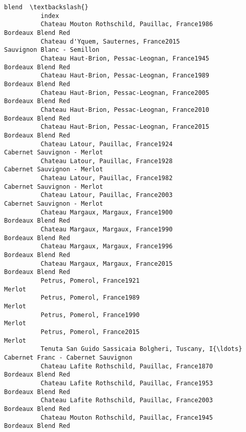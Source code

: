 \documentclass[11pt]{article}
\begin{document}
\begin{Verbatim}[commandchars=\\\{\}]
                                                                                            blend  \textbackslash{}
          index                                                                                     
          Chateau Mouton Rothschild, Pauillac, France1986                      Bordeaux Blend Red   
          Chateau d'Yquem, Sauternes, France2015                       Sauvignon Blanc - Semillon   
          Chateau Haut-Brion, Pessac-Leognan, France1945                       Bordeaux Blend Red   
          Chateau Haut-Brion, Pessac-Leognan, France1989                       Bordeaux Blend Red   
          Chateau Haut-Brion, Pessac-Leognan, France2005                       Bordeaux Blend Red   
          Chateau Haut-Brion, Pessac-Leognan, France2010                       Bordeaux Blend Red   
          Chateau Haut-Brion, Pessac-Leognan, France2015                       Bordeaux Blend Red   
          Chateau Latour, Pauillac, France1924                        Cabernet Sauvignon - Merlot   
          Chateau Latour, Pauillac, France1928                        Cabernet Sauvignon - Merlot   
          Chateau Latour, Pauillac, France1982                        Cabernet Sauvignon - Merlot   
          Chateau Latour, Pauillac, France2003                        Cabernet Sauvignon - Merlot   
          Chateau Margaux, Margaux, France1900                                 Bordeaux Blend Red   
          Chateau Margaux, Margaux, France1990                                 Bordeaux Blend Red   
          Chateau Margaux, Margaux, France1996                                 Bordeaux Blend Red   
          Chateau Margaux, Margaux, France2015                                 Bordeaux Blend Red   
          Petrus, Pomerol, France1921                                                      Merlot   
          Petrus, Pomerol, France1989                                                      Merlot   
          Petrus, Pomerol, France1990                                                      Merlot   
          Petrus, Pomerol, France2015                                                      Merlot   
          Tenuta San Guido Sassicaia Bolgheri, Tuscany, I{\ldots}  Cabernet Franc - Cabernet Sauvignon   
          Chateau Lafite Rothschild, Pauillac, France1870                      Bordeaux Blend Red   
          Chateau Lafite Rothschild, Pauillac, France1953                      Bordeaux Blend Red   
          Chateau Lafite Rothschild, Pauillac, France2003                      Bordeaux Blend Red   
          Chateau Mouton Rothschild, Pauillac, France1945                      Bordeaux Blend Red   

\end{Verbatim}
\end{document}
